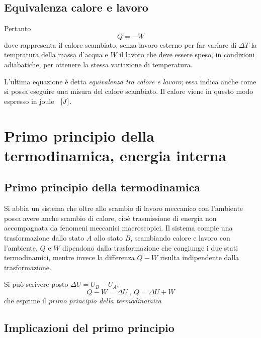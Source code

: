 \documentclass[class=book, crop=false, oneside, 12pt]{standalone}
\begin{document}
\subsection{Equivalenza calore e lavoro}

Pertanto 
\begin{equation}
    Q = -W
\end{equation}
dove rappresenta il calore scambiato, senza lavoro esterno per far variare di \(\Delta T\) la tempratura della massa d'acqua e \(W\) il lavoro che deve essere speso, in condizioni adiabatiche, per ottenere la stessa variazione di temperatura. 

L'ultima equazione è detta \emph{equivalenza tra calore e lavoro}; essa indica anche come si possa eseguire una misura del calore scambiato. 
Il calore viene in questo modo espresso in joule \(\hspace{0.2cm} \left[J\right]\).

\section{Primo principio della termodinamica, energia interna}

\subsection{Primo principio della termodinamica}

Si abbia un sistema che oltre allo scambio di lavoro meccanico con l'ambiente possa avere anche scambio di calore, cioè trasmissione di energia non accompagnata da fenomeni meccanici macroscopici.
Il sistema compie una trasformazione dallo stato \(A\) allo stato \(B\), scambiando calore e lavoro con l'ambiente, \(Q\) e \(W\) dipendono dalla trasformazione che congiunge i due stati termodinamici, mentre invece la differenza \(Q-W\) risulta indipendente dalla trasformazione. 

Si può scrivere posto \(\Delta U = U_B - U_A\):
\begin{equation} \label{primo_principio_termodinamica}
    Q - W = \Delta U \ , \ Q = \Delta U + W
\end{equation}
che esprime il \emph{primo principio della termodinamica}

\subsection{Implicazioni del primo principio}
\end{document}
